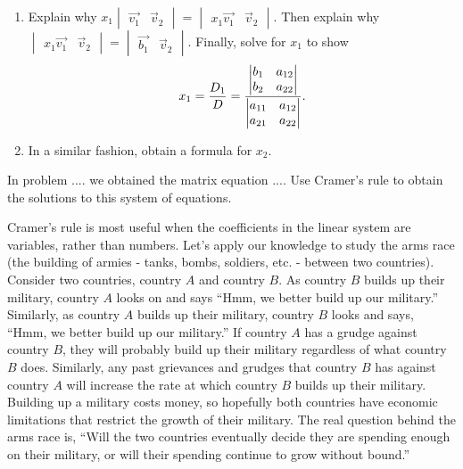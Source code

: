 \begin{problem}
\begin{enumerate}
 \item Explain why $x_1\begin{vmatrix}\vec{v_1}&\vec v_2\end{vmatrix}=\begin{vmatrix}x_1\vec{v_1}&\vec v_2\end{vmatrix}$.  Then explain why $\begin{vmatrix}x_1\vec{v_1}&\vec v_2\end{vmatrix} = \begin{vmatrix}\vec{b_1}&\vec v_2\end{vmatrix}$.  Finally, solve for $x_1$ to show $$x_1 = \frac{D_1}{D}=\frac{\begin{vmatrix}\begin{matrix} b_1\\b_2 \end{matrix}&\begin{matrix} a_{12}\\a_{22} \end{matrix} \end{vmatrix}}{\begin{vmatrix}\begin{matrix} a_{11}\\a_{21} \end{matrix}&\begin{matrix} a_{12}\\a_{22} \end{matrix} \end{vmatrix}}.$$
 \item In a similar fashion, obtain a formula for $x_2$. 
\end{enumerate}
\end{problem}

\begin{problem}
 In problem .... we obtained the matrix equation ....  Use Cramer's rule to obtain the solutions to this system of equations. 
\end{problem}


Cramer's rule is most useful when the coefficients in the linear system are variables, rather than numbers.  
Let's apply our knowledge to study the arms race (the building of armies - tanks, bombs, soldiers, etc. - between two countries).  Consider two countries, country $A$ and country $B$. As country $B$ builds up their military, country $A$ looks on and says ``Hmm, we better build up our military.''  Similarly, as country $A$ builds up their military, country $B$ looks and says, ``Hmm, we better build up our military.''  If country $A$ has a grudge against country $B$, they will probably build up their military regardless of what country $B$ does.  Similarly, any past grievances and grudges that country $B$ has against country $A$ will increase the rate at which country $B$ builds up their military. Building up a military costs money, so hopefully both countries have economic limitations that restrict the growth of their military. The real question behind the arms race is, ``Will the two countries eventually decide they are spending enough on their military, or will their spending continue to grow without bound.''

